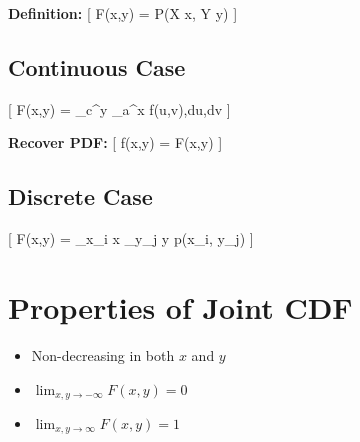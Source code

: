 \documentclass[12pt]{article}
\begin{document}
\textbf{Definition:}
[
F(x,y) = P(X \le x, Y \le y)
]

\subsection{Continuous Case}

[
F(x,y) = \int_c^y \int_a^x f(u,v),du,dv
]

\textbf{Recover PDF:}
[
f(x,y) =  F(x,y)
]

\subsection{Discrete Case}

[
F(x,y) = \sum_{x_i \le x} \sum_{y_j \le y} p(x_i, y_j)
]

\section{Properties of Joint CDF}

\begin{itemize}
\item Non-decreasing in both $x$ and $y$
\item $\lim_{x,y \to -\infty} F(x,y) = 0$
\item $\lim_{x,y \to \infty} F(x,y) = 1$
\end{itemize}
\end{document}

